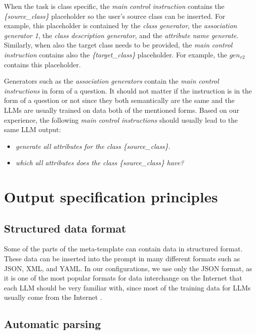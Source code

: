 When the task is class specific, the \emph{main control instruction} contains the \textit{\{source\_class\}} placeholder so the user's source class can be inserted. For example, this placeholder is contained by the \textit{class generator}, the \textit{association generator 1}, the \textit{class description generator}, and the \textit{attribute name generate}. Similarly, when also the target class needs to be provided, the \emph{main control instruction} contains also the \textit{\{target\_class\}} placeholder. For example, the $gen_{r2}$ contains this placeholder.

Generators such as the \emph{association generators} contain the \emph{main control instructions} in form of a question. It should not matter if the instruction is in the form of a question or not since they both semantically are the same and the LLMs are usually trained on data both of the mentioned forms. Based on our experience, the following \emph{main control instructions} should usually lead to the same LLM output:

\begin{itemize}
\item \textit{generate all attributes for the class \{source\_class\}.}
\item \textit{which all attributes does the class \{source\_class\} have?}
\end{itemize}


\section{Output specification principles}


\subsection{Structured data format}

Some of the parts of the meta-template can contain data in structured format. These data can be inserted into the prompt in many different formats such as JSON, XML, and YAML. In our configurations, we use only the JSON format, as it is one of the most popular formats for data interchange on the Internet that each LLM should be very familiar with, since most of the training data for LLMs usually come from the Internet \cite{Zhao2023}.


\subsection{Automatic parsing}

